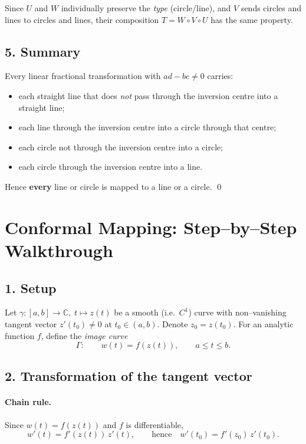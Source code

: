 \documentclass[12pt]{article}
\theoremstyle{definition} %
\theoremstyle{plain} %
\begin{document}
Since \(U\) and \(W\) individually preserve the \emph{type} (circle/line),
and \(V\) sends circles and lines to circles and lines,
their composition \(T=W\circ V\circ U\) has the same property.

\subsection*{5.  Summary}

Every linear fractional transformation with \(ad-bc\ne0\) carries:

\begin{itemize}
\item each straight line that does \emph{not} pass through the inversion
      centre into a straight line;
\item each line through the inversion centre into a circle through that
      centre;
\item each circle not through the inversion centre into a circle;
\item each circle through the inversion centre into a line.
\end{itemize}
Hence \textbf{every} line or circle is mapped to a line or a circle.
\qed
\section*{Conformal Mapping:  Step--by--Step Walkthrough}

\subsection*{1.\;  Setup}

Let $\gamma:[a,b]\to\mathbb C,\;t\mapsto z(t)$ be a smooth (i.e.\ $C^{1}$) curve
with non--vanishing tangent vector $z'(t_{0})\neq0$ at $t_{0}\in(a,b)$.
Denote $z_{0}=z(t_{0})$.
For an analytic function $f$, define the \emph{image curve}
\[
   \Gamma:\qquad w(t)=f(z(t)),\qquad a\le t\le b .
\]

\subsection*{2.\;  Transformation of the tangent vector}

\paragraph{Chain rule.}
Since $w(t)=f(z(t))$ and $f$ is differentiable,
\[
   w'(t)=f'(z(t))\,z'(t),\qquad
   \text{hence}\quad
   w'(t_{0}) = f'(z_{0})\,z'(t_{0}).      \tag{1}
\]
\end{document}
